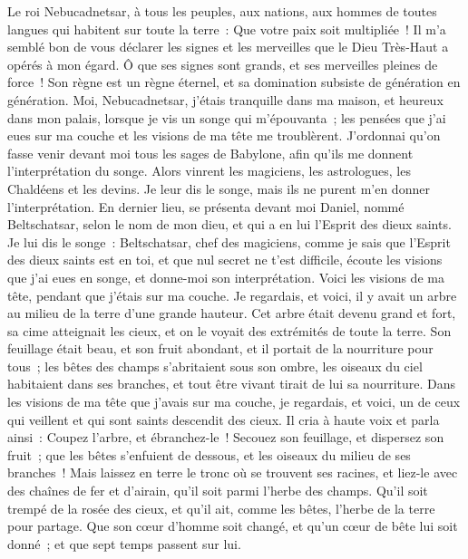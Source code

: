 \begin{multicols}{2}
\VerseOne{}Le roi Nebucadnetsar, à tous les peuples, aux nations, aux hommes de toutes langues qui habitent sur toute la terre~: Que votre paix soit multipliée~!
Il m'a semblé bon de vous déclarer les signes et les merveilles que le Dieu Très-Haut a opérés à mon égard.
Ô que ses signes sont grands, et ses merveilles pleines de force~! Son règne est un règne éternel, et sa domination subsiste de génération en génération.
Moi, Nebucadnetsar, j'étais tranquille dans ma maison, et heureux dans mon palais,
lorsque je vis un songe qui m'épouvanta~; les pensées que j'ai eues sur ma couche et les visions de ma tête me troublèrent.
J'ordonnai qu'on fasse venir devant moi tous les sages de Babylone, afin qu'ils me donnent l'interprétation du songe.
Alors vinrent les magiciens, les astrologues, les Chaldéens et les devins. Je leur dis le songe, mais ils ne purent m'en donner l'interprétation.
En dernier lieu, se présenta devant moi Daniel, nommé Beltschatsar, selon le nom de mon dieu, et qui a en lui l'Esprit des dieux saints. Je lui dis le songe~:
Beltschatsar, chef des magiciens, comme je sais que l'Esprit des dieux saints est en toi, et que nul secret ne t'est difficile, écoute les visions que j'ai eues en songe, et donne-moi son interprétation.
Voici les visions de ma tête, pendant que j'étais sur ma couche. Je regardais, et voici, il y avait un arbre au milieu de la terre d'une grande hauteur.
Cet arbre était devenu grand et fort, sa cime atteignait les cieux, et on le voyait des extrémités de toute la terre.
Son feuillage était beau, et son fruit abondant, et il portait de la nourriture pour tous~; les bêtes des champs s'abritaient sous son ombre, les oiseaux du ciel habitaient dans ses branches, et tout être vivant tirait de lui sa nourriture.
Dans les visions de ma tête que j'avais sur ma couche, je regardais, et voici, un de ceux qui veillent et qui sont saints descendit des cieux.
Il cria à haute voix et parla ainsi~: Coupez l'arbre, et ébranchez-le~! Secouez son feuillage, et dispersez son fruit~; que les bêtes s'enfuient de dessous, et les oiseaux du milieu de ses branches~!
Mais laissez en terre le tronc où se trouvent ses racines, et liez-le avec des chaînes de fer et d'airain, qu'il soit parmi l'herbe des champs. Qu'il soit trempé de la rosée des cieux, et qu'il ait, comme les bêtes, l'herbe de la terre pour partage.
Que son cœur d'homme soit changé, et qu'un cœur de bête lui soit donné~; et que sept temps passent sur lui.

\end{multicols}
